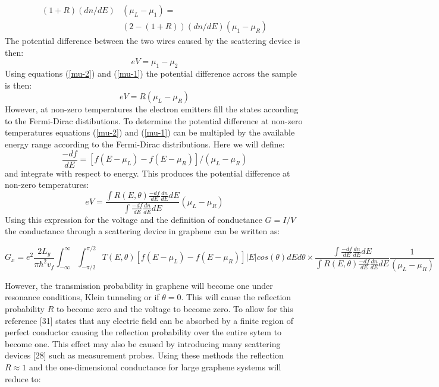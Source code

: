 \documentclass[prl,twocolumn,aps,superscriptaddress,floatfix,10pt]{revtex4}
\begin{document}
			\begin{align}
				\left(1+R\right)\left(dn/dE\right)&\left(\mu_{L}-\mu_{1}\right)=\\
				&\left(2-\left(1+R\right)\right)\left(dn/dE\right)\left(\mu_{1}-\mu_{R}\right)
				\label{mu-1}
			\end{align}
			The potential difference between the two wires caused by the scattering device is then:
			\begin{equation}
				eV=\mu_{1}-\mu_{2}
			\end{equation}
			Using equations (\ref{mu-2}) and (\ref{mu-1}) the potential difference across the sample is then:
			\begin{equation}
				eV=R\left(\mu_{L}-\mu_{R}\right)
			\end{equation}
			However, at non-zero temperatures the electron emitters fill the states according to the Fermi-Dirac distibutions. To determine the potential difference at non-zero temperatures equations (\ref{mu-2}) and (\ref{mu-1}) can be multipled by the available energy range according to the Fermi-Dirac distributions. Here we will define:
			\begin{equation}
				\frac{-df}{dE}=\left[f\left(E-\mu_{L}\right)-f\left(E-\mu_{R}\right)\right]/\left(\mu_{L}-\mu_{R}\right)
			\end{equation}
			and integrate with respect to energy. This produces the potential difference at non-zero temperatures:
			\begin{equation}
				eV=\frac{\int R\left(E,\theta\right) \frac{-df}{dE} \frac{dn}{dE}dE}{\int\frac{-df}{dE} \frac{dn}{dE}dE}\left(\mu_{L}-\mu_{R}\right)
			\end{equation}
			Using this expression for the voltage and the definition of conductance $G=I/V$ the conductance through a scattering device in graphene can be written as:
			\begin{widetext}
			\begin{equation}
				G_{x}=e^{2}\frac{2L_{y}}{\pi\hbar^{2}v_{f}}\int^{\infty}_{-\infty}\int^{\pi/2}_{-\pi/2}T\left(E,\theta\right)\left[f\left(E-\mu_{L}\right)-f\left(E-\mu_{R}\right)\right]|E|cos\left(\theta\right)dEd\theta\times\frac{\int\frac{-df}{dE} \frac{dn}{dE}dE}{\int R\left(E,\theta\right) \frac{-df}{dE} \frac{dn}{dE}dE}\frac{1}{\left(\mu_{L}-\mu_{R}\right)}
			\end{equation}
			\end{widetext}
			However, the transmission probability in graphene will become one under resonance conditions, Klein tunneling or if $\theta=0$. This will cause the reflection probability $R$ to become zero and the voltage to become zero. To allow for this reference [31] states that any electric field can be absorbed by a finite region of perfect conductor causing the reflection probability over the entire sytem to become one. This effect may also be caused by introducing many scattering devices [28] such as measurement probes. Using these methods the reflection $R \approx 1$ and the one-dimensional conductance for large graphene systems will reduce to:
\end{document}
